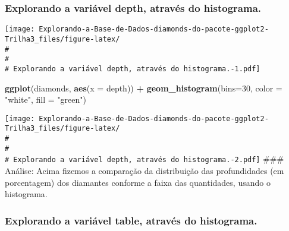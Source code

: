\documentclass[
]{article}
\newenvironment{Shaded}{\begin{snugshade}}{\end{snugshade}}
\newcommand{\DataTypeTok}[1]{\textcolor[rgb]{0.13,0.29,0.53}{#1}}
\newcommand{\DecValTok}[1]{\textcolor[rgb]{0.00,0.00,0.81}{#1}}
\newcommand{\KeywordTok}[1]{\textcolor[rgb]{0.13,0.29,0.53}{\textbf{#1}}}
\newcommand{\NormalTok}[1]{#1}
\newcommand{\OperatorTok}[1]{\textcolor[rgb]{0.81,0.36,0.00}{\textbf{#1}}}
\newcommand{\StringTok}[1]{\textcolor[rgb]{0.31,0.60,0.02}{#1}}
\begin{document}
\hypertarget{explorando-a-variuxe1vel-depth-atravuxe9s-do-histograma.}{%
\subsubsection{Explorando a variável depth, através do
histograma.}\label{explorando-a-variuxe1vel-depth-atravuxe9s-do-histograma.}}

\begin{Shaded}
\end{Shaded}

\texttt{[image: Explorando-a-Base-de-Dados-diamonds-do-pacote-ggplot2-Trilha3\_files/figure-latex/\\\#\\\#\\\# Explorando a variável depth, através do histograma.-1.pdf]}

\begin{Shaded}
\begin{Highlighting}[]
\KeywordTok{ggplot}\NormalTok{(diamonds, }\KeywordTok{aes}\NormalTok{(}\DataTypeTok{x =}\NormalTok{ depth)) }\OperatorTok{+}\StringTok{ }\KeywordTok{geom_histogram}\NormalTok{(}\DataTypeTok{bins=}\DecValTok{30}\NormalTok{, }\DataTypeTok{color =} \StringTok{"white"}\NormalTok{, }\DataTypeTok{fill =} \StringTok{"green"}\NormalTok{)}
\end{Highlighting}
\end{Shaded}

\texttt{[image: Explorando-a-Base-de-Dados-diamonds-do-pacote-ggplot2-Trilha3\_files/figure-latex/\\\#\\\#\\\# Explorando a variável depth, através do histograma.-2.pdf]}
\#\#\# Análise: Acima fizemos a comparação da distribuição das
profundidades (em porcentagem) dos diamantes conforme a faixa das
quantidades, usando o histograma.

\hypertarget{explorando-a-variuxe1vel-table-atravuxe9s-do-histograma.}{%
\subsubsection{Explorando a variável table, através do
histograma.}\label{explorando-a-variuxe1vel-table-atravuxe9s-do-histograma.}}

\begin{Shaded}
\end{Shaded}
\end{document}
